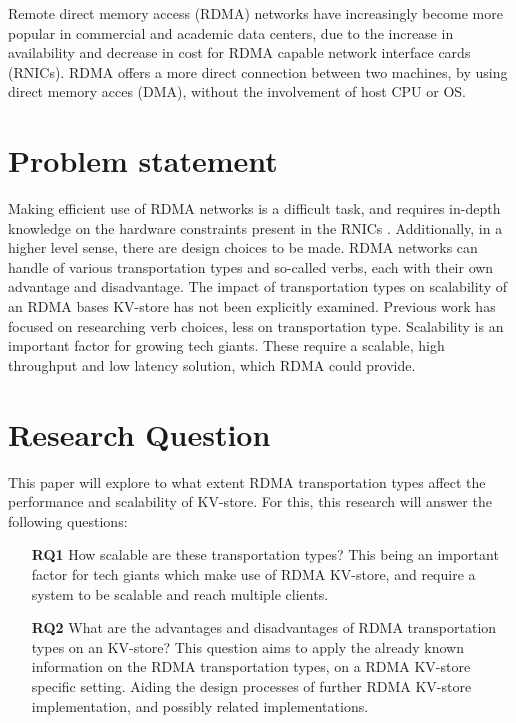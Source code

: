 Remote direct memory access (RDMA) networks have increasingly become more popular in commercial and academic data centers, due to the increase in availability and decrease in cost for RDMA capable network interface cards (RNICs).
RDMA offers a more direct connection between two machines, by using direct memory acces (DMA), without the involvement of host CPU or OS.

\section{Problem statement}
Making efficient use of RDMA networks is a difficult task, and requires in-depth knowledge on the hardware constraints present in the RNICs \cite{kalia2016design, chen2019scalable}.
Additionally, in a higher level sense, there are design choices to be made.
RDMA networks can handle of various transportation types and so-called verbs, each with their own advantage and disadvantage.
The impact of transportation types on scalability of an RDMA bases KV-store has not been explicitly examined.
Previous work has focused on researching verb choices, less on transportation type\cite{kalia2014using, kalia2016fasst, mitchell2013using}.
Scalability is an important factor for growing tech giants.
These require a scalable, high throughput and low latency solution\cite{decandia2007dynamo}, which RDMA could provide.

\section{Research Question}
This paper will explore to what extent RDMA transportation types affect the performance and scalability of KV-store.
For this, this research will answer the following questions:

\begin{itemize}
    \item[\textbf{RQ1}] How scalable are these transportation types?%
    This being an important factor for tech giants which make use of RDMA KV-store, and require a system to be scalable and reach multiple clients.
    \item[\textbf{RQ2}] What are the advantages and disadvantages of RDMA transportation types on an KV-store?
    This question aims to apply the already known information on the RDMA transportation types, on a RDMA KV-store specific setting.
    Aiding the design processes of further RDMA KV-store implementation, and possibly related implementations.
\end{itemize}

